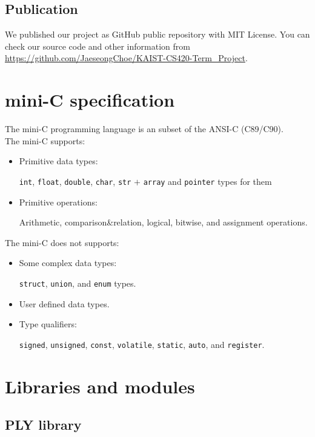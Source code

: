 \documentclass{article}
\newcommand{\code}[1]{\texttt{#1}}
\begin{document}
	\subsection{Publication}
	
	We published our project as GitHub public repository with MIT License. You can check our source code and other information from \url{https://github.com/JaeseongChoe/KAIST-CS420-Term\_Project}.
	
	\section{mini-C specification}
	
	The mini-C programming language is an subset of the ANSI-C (C89/C90).\\
	The mini-C supports:
	\begin{itemize}
		\item Primitive data types:
		
		\code{int}, \code{float}, \code{double}, \code{char}, \code{str} $+$ \code{array} and \code{pointer} types for them
		
		\item Primitive operations:
		
		Arithmetic, comparison\&relation, logical, bitwise, and assignment operations.
	\end{itemize}
	The mini-C does not supports:
	\begin{itemize}
		\item Some complex data types:
		
		\code{struct}, \code{union}, and \code{enum} types.
		
		\item User defined data types.
		
		\item Type qualifiers:
		
		\code{signed}, \code{unsigned}, \code{const}, \code{volatile}, \code{static}, \code{auto}, and \code{register}.
	\end{itemize}
	
	\section{Libraries and modules}
	
	\subsection{PLY library}
	
\end{document}
